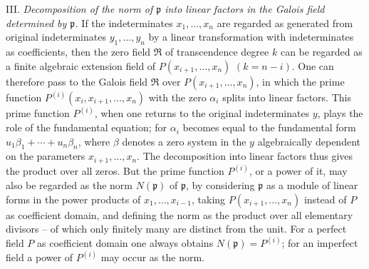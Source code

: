 \documentclass[11pt]{article}
\begin{document}
III. \emph{Decomposition of the norm of $\mathfrak p$ into linear factors in the Galois field determined by $\mathfrak p$.} If the indeterminates $x_1,\ldots,x_n$ are regarded as generated from original indeterminates $y_1,\ldots,y_n$ by a linear transformation with indeterminates as coefficients, then the zero field $\mathfrak R$ of transcendence degree $k$ can be regarded as a finite algebraic extension field of $P(x_{i+1},\ldots,x_n)$ $(k=n-i)$. One can therefore pass to the Galois field $\mathfrak R$ over $P(x_{i+1},\ldots,x_n)$, in which the prime function $P^{(i)}(x_i,x_{i+1},\ldots,x_n)$ with the zero $\alpha_i$ splits into linear factors. This prime function $P^{(i)}$, when one returns to the original indeterminates $y$, plays the role of the fundamental equation; for $\alpha_i$ becomes equal to the fundamental form $u_1\beta_1+\cdots+u_n\beta_n$, where $\beta$ denotes a zero system in the $y$ algebraically dependent on the parameters $x_{i+1},\ldots,x_n$. The decomposition into linear factors thus gives the product over all zeros. But the prime function $P^{(i)}$, or a power of it, may also be regarded as the norm $N(\mathfrak p)$ of $\mathfrak p$, by considering $\mathfrak p$ as a module of linear forms in the power products of $x_1,\ldots,x_{i-1}$, taking $P(x_{i+1},\ldots,x_n)$ instead of $P$ as coefficient domain, and defining the norm as the product over all elementary divisors -- of which only finitely many are distinct from the unit. For a perfect field $P$ as coefficient domain one always obtains $N(\mathfrak p)=P^{(i)}$; for an imperfect field a power of $P^{(i)}$ may occur as the norm.
\end{document}
